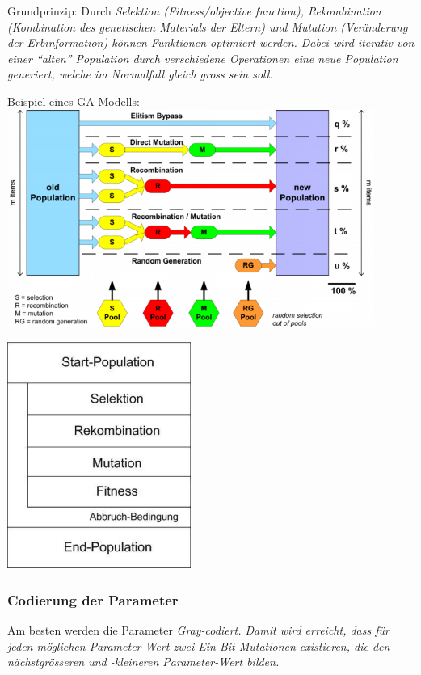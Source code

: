     Grundprinzip: Durch \em Selektion \em (Fitness/objective function), \em Rekombination \em (Kombination des genetischen Materials der Eltern) und \em Mutation \em (Veränderung der Erbinformation) können Funktionen optimiert werden. Dabei wird iterativ von einer "`alten"' Population durch verschiedene Operationen eine neue Population generiert, welche im Normalfall gleich gross sein soll.\\
    
  \begin{minipage}{12cm}  
    Beispiel eines GA-Modells:\\
    \includegraphics[width=12cm]{./Content/MetaHeuristics/GeneticAlgorithms_Model}
  \end{minipage}
  \begin{minipage}{7cm}
    \begin{flushright}
      \includegraphics[width=6cm]{./Content/MetaHeuristics/GeneticAlgorithms_Principle}
    \end{flushright}
  \end{minipage}
    \subsubsection{Codierung der Parameter }
      Am besten werden die Parameter \em Gray\em -codiert. Damit wird erreicht, dass für jeden möglichen Parameter-Wert zwei Ein-Bit-Mutationen existieren, die den nächstgrösseren und -kleineren Parameter-Wert bilden.
      
